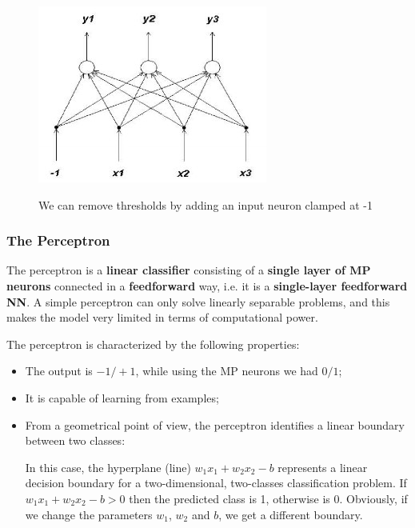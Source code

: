 \begin{figure}[h!]
		\centering
        \includegraphics[scale = 1.5]{img/thresholds.jpg}
		\label{mi}
        \caption{We can remove thresholds by adding an input neuron clamped at -1}
\end{figure}

\subsubsection{The Perceptron}
The perceptron is a \textbf{linear classifier} consisting of a \textbf{single layer of MP neurons} connected in a \textbf{feedforward} way, i.e. it is a \textbf{single-layer feedforward NN}. A simple perceptron can only solve linearly separable problems, and this makes the model very limited in terms of computational power. 


The perceptron is characterized by the following properties:

\begin{itemize}
    \item The output is $-1/+1$, while using the MP neurons we had $0/1$;
    
    \item It is capable of learning from examples;
    
    \item From a geometrical point of view, the perceptron identifies a linear boundary between two classes:


    In this case, the hyperplane (line) $w_1x_1 + w_2x_2 - b$ represents a linear decision boundary for a two-dimensional, two-classes classification problem. If $w_1x_1 + w_2x_2 - b > 0$ then the predicted class is 1, otherwise is 0. Obviously, if we change the parameters $w_1$, $w_2$ and $b$, we get a different boundary.
    
\end{itemize}

